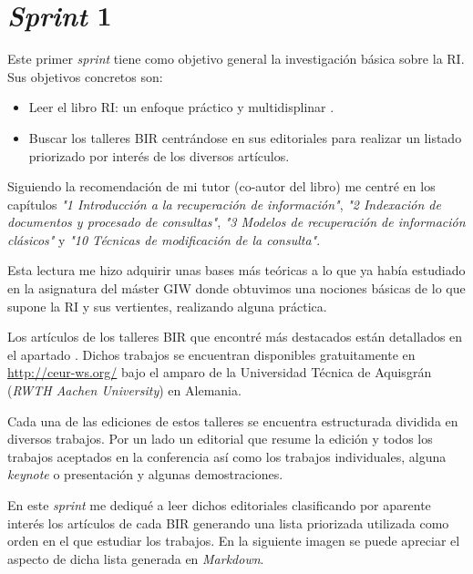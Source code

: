 \section{\textit{Sprint} 1}
Este primer \textit{sprint} tiene como objetivo general la investigación básica sobre la \acrshort{RI}. Sus objetivos concretos son: 

\begin{itemize}
	\item Leer el libro \acrlong{RI}: un enfoque práctico y multidisplinar \cite{RIspaBook}.
	\item Buscar los talleres \acrshort{BIR} centrándose en sus editoriales para realizar un listado priorizado por interés de los diversos artículos.
\end{itemize}

Siguiendo la recomendación de mi tutor (co-autor del libro) me centré en los capítulos \textit{"1 Introducción a la recuperación de información"}, \textit{"2 Indexación de documentos y procesado de consultas"}, \textit{"3 Modelos de recuperación de información clásicos"} y \textit{"10 Técnicas de modificación de la consulta"}. 

Esta lectura me hizo adquirir unas bases más teóricas a lo que ya había estudiado en la asignatura del máster \acrlong{GIW} donde obtuvimos una nociones básicas de lo que supone la \acrshort{RI} y sus vertientes, realizando alguna práctica.

Los artículos de los talleres \acrlong{BIR} que encontré más destacados están detallados en el apartado . Dichos trabajos se encuentran disponibles gratuitamente en \url{http://ceur-ws.org/} bajo el amparo de la Universidad Técnica de Aquisgrán (\textit{RWTH Aachen University}) en Alemania.

Cada una de las ediciones de estos talleres se encuentra estructurada dividida en diversos trabajos. Por un lado un editorial que resume la edición y todos los trabajos aceptados en la conferencia así como los trabajos individuales, alguna \textit{keynote} o presentación y algunas demostraciones. 

En este \textit{sprint} me dediqué a leer dichos editoriales clasificando por aparente interés los artículos de cada \acrshort{BIR} generando una lista priorizada utilizada como orden en el que estudiar los trabajos. En la siguiente imagen se puede apreciar el aspecto de dicha lista generada en \textit{Markdown}.

